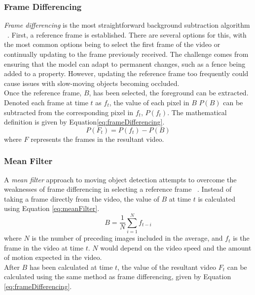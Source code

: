 \subsubsection{Frame Differencing}
\setlength{\leftskip}{0.5cm}
\indent \indent
\textit{Frame differencing} is the most straightforward background subtraction algorithm ~\cite{FrameDifferencing}. First, a reference frame is established. There are several options for this, with the most common options being to select the first frame of the video or continually updating to the frame previously received. The challenge comes from ensuring that the model can adapt to permanent changes, such as a fence being added to a property. However, updating the reference frame too frequently could cause issues with slow-moving objects becoming occluded.
\smallskip \\ \indent
Once the reference frame, $B$, has been selected, the foreground can be extracted. Denoted each frame at time $t$ as $f_t$, the value of each pixel in $B$ $P(B)$ can be subtracted from the corresponding pixel in $f_t$, $P(f_t)$. The mathematical definition is given by Equation\ref{eq:frameDifferencing}.
\begin{equation}
    \label{eq:frameDifferencing}
    P(F_t) = P(f_t) - P(B)
\end{equation}
where $F$ represents the frames in the resultant video.

\setlength{\leftskip}{0cm}
\subsubsection{Mean Filter}
\setlength{\leftskip}{0.5cm}
\indent \indent
A \textit{mean filter} approach to moving object detection attempts to overcome the weaknesses of frame differencing in selecting a reference frame ~\cite{MeanFilter}. Instead of taking a frame directly from the video, the value of $B$ at time $t$ is calculated using Equation \ref{eq:meanFilter}.
\begin{equation}
    \label{eq:meanFilter}
    B = \frac{1}{N} \sum^N_{i=1} f_{t-i}
\end{equation}
where $N$ is the number of preceding images included in the average, and $f_t$ is the frame in the video at time $t$. $N$ would depend on the video speed and the amount of motion expected in the video.
\smallskip \\ \indent
After $B$ has been calculated at time $t$, the value of the resultant video $F_t$ can be calculated using the same method as frame differencing, given by Equation \ref{eq:frameDifferencing}.

